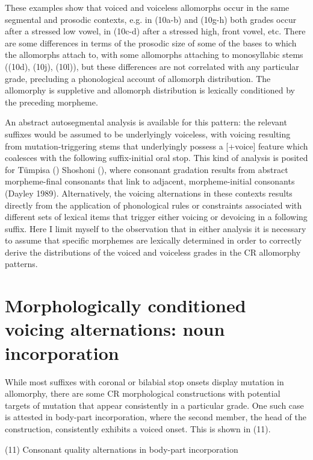 These examples show that voiced and voiceless allomorphs occur in the same segmental and prosodic contexts, e.g. in (10a-b) and (10g-h) both grades occur after a stressed low vowel, in (10c-d) after a stressed high, front vowel, etc. There are some differences in terms of the prosodic size of some of the bases to which the allomorphs attach to, with some allomorphs attaching to monosyllabic stems ((10d), (10j), (10l)), but these differences are not correlated with any particular grade, precluding a phonological account of allomorph distribution. The allomorphy is suppletive and allomorph distribution is lexically conditioned by the preceding morpheme.

An abstract autosegmental analysis is available for this pattern: the relevant suffixes would be assumed to be underlyingly voiceless, with voicing resulting from mutation-triggering stems that underlyingly possess a [+voice] feature which coalesces with the following suffix-initial oral stop. This kind of analysis is posited for Tümpisa () Shoshoni (), where consonant gradation results from abstract morpheme-final consonants that link to adjacent, morpheme-initial consonants (Dayley 1989). Alternatively, the voicing alternations in these contexts results directly from the application of phonological rules or constraints associated with different sets of lexical items that trigger either voicing or devoicing in a following suffix. Here I limit myself to the observation that in either analysis it is necessary to assume that specific morphemes are lexically determined in order to correctly derive the distributions of the voiced and voiceless grades in the CR allomorphy patterns.


\section{Morphologically conditioned voicing alternations: noun incorporation}
\label{sec: morphologically conditioned voicing alternations}

While most suffixes with coronal or bilabial stop onsets display mutation in allomorphy, there are some CR morphological constructions with potential targets of mutation that appear consistently in a particular grade. One such case is attested in body-part incorporation, where the second member, the head of the construction, consistently exhibits a voiced onset. This is shown in (11).

(11)	Consonant quality alternations in body-part incorporation

